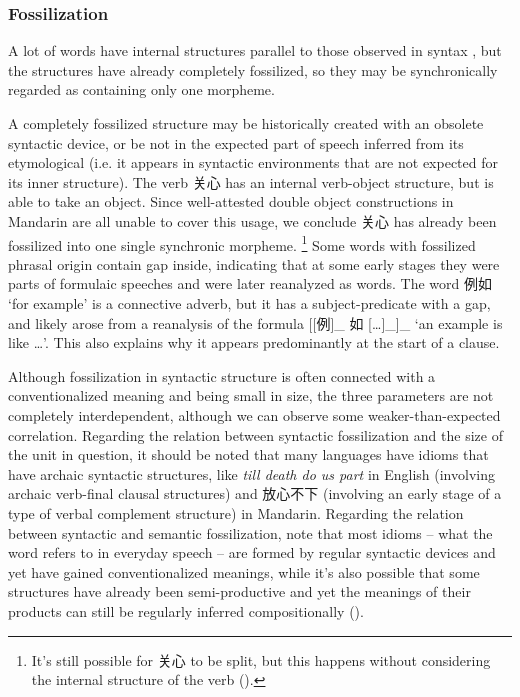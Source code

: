 \documentclass[UTF8, a4paper, oneside, scheme=plain]{ctexrep}
\newcommand*{\citesec}[1]{\S~{#1}}
\newcommand{\corpus}[1]{\emph{#1}}
\newcommand{\translate}[1]{`#1'}
\begin{document}
\subsubsection{Fossilization}\label{sec:pos.morpheme.fossilization}

A lot of words have internal structures parallel to 
those observed in syntax \citep[\citesec{2.6}]{zhudexigrammar},
but the structures have already completely fossilized, 
so they may be synchronically regarded as containing only one morpheme.

A completely fossilized structure 
may be historically created with an obsolete syntactic device, 
or be not in the expected part of speech inferred from its etymological
(i.e. it appears in syntactic environments that are not expected 
for its inner structure).
The verb 关心 has an internal verb-object structure, 
but is able to take an object.
Since well-attested double object constructions in Mandarin
are all unable to cover this usage,
we conclude 关心 has already been fossilized into one single synchronic morpheme.%
\footnote{
    It's still possible for 关心 to be split, 
    but this happens without considering the internal structure of the verb
    ().
}
Some words with fossilized phrasal origin 
contain gap inside, 
indicating that at some early stages 
they were parts of formulaic speeches 
and were later reanalyzed as words.
The word 例如 \translate{for example}
is a connective adverb, 
but it has a subject-predicate with a gap,
and likely arose from a reanalysis of the formula 
[[例]_{} 如 [\dots]_{}]_{}
\translate{an example is like \dots}.
This also explains why it appears predominantly at the start of a clause.

Although fossilization in syntactic structure 
is often connected with 
a conventionalized meaning and being small in size,
the three parameters are not completely interdependent, 
although we can observe some weaker-than-expected correlation.
Regarding the relation between syntactic fossilization 
and the size of the unit in question, 
it should be noted that many languages have 
idioms that have archaic syntactic structures, 
like \corpus{till death do us part} in English 
(involving archaic verb-final clausal structures)
and 放心不下 (involving an early stage of a type of verbal complement structure) 
in Mandarin.
Regarding the relation between syntactic and semantic fossilization, 
note that most idioms -- what the word refers to in everyday speech -- 
are formed by regular syntactic devices and yet have gained conventionalized meanings, 
while it's also possible that some structures have already been semi-productive
and yet the meanings of their products can still be 
regularly inferred compositionally
().
\end{document}
